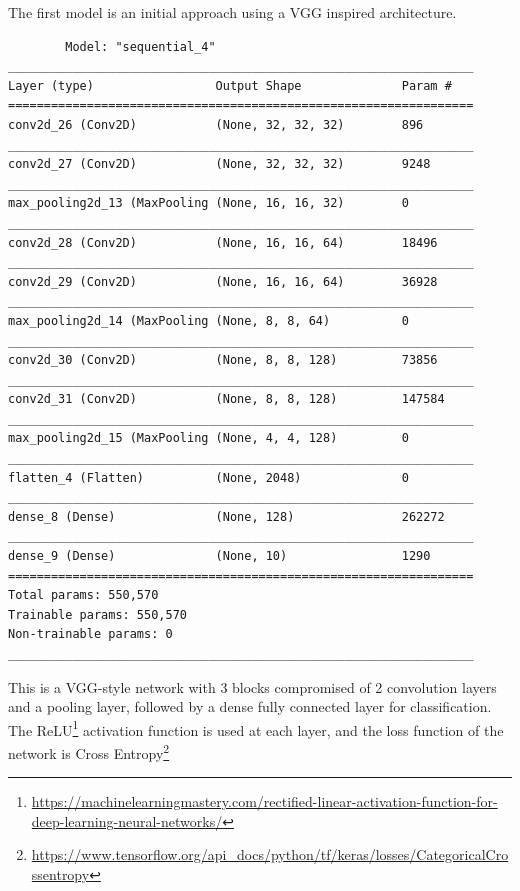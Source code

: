 The first model is an initial approach using a VGG inspired architecture.
\begin{center}
    \begin{verbatim}
        Model: "sequential_4"
_________________________________________________________________
Layer (type)                 Output Shape              Param #   
=================================================================
conv2d_26 (Conv2D)           (None, 32, 32, 32)        896       
_________________________________________________________________
conv2d_27 (Conv2D)           (None, 32, 32, 32)        9248      
_________________________________________________________________
max_pooling2d_13 (MaxPooling (None, 16, 16, 32)        0         
_________________________________________________________________
conv2d_28 (Conv2D)           (None, 16, 16, 64)        18496     
_________________________________________________________________
conv2d_29 (Conv2D)           (None, 16, 16, 64)        36928     
_________________________________________________________________
max_pooling2d_14 (MaxPooling (None, 8, 8, 64)          0         
_________________________________________________________________
conv2d_30 (Conv2D)           (None, 8, 8, 128)         73856     
_________________________________________________________________
conv2d_31 (Conv2D)           (None, 8, 8, 128)         147584    
_________________________________________________________________
max_pooling2d_15 (MaxPooling (None, 4, 4, 128)         0         
_________________________________________________________________
flatten_4 (Flatten)          (None, 2048)              0         
_________________________________________________________________
dense_8 (Dense)              (None, 128)               262272    
_________________________________________________________________
dense_9 (Dense)              (None, 10)                1290      
=================================================================
Total params: 550,570
Trainable params: 550,570
Non-trainable params: 0
_________________________________________________________________
    \end{verbatim}
\end{center}
This is a VGG-style network with 3 blocks compromised of 2 convolution layers and a pooling layer, followed by a dense fully connected layer for classification.
The ReLU\footnote{\href{https://machinelearningmastery.com/rectified-linear-activation-function-for-deep-learning-neural-networks/}{https://machinelearningmastery.com/rectified-linear-activation-function-for-deep-learning-neural-networks/}} activation function is used at each layer, and the loss function of the network is Cross Entropy\footnote{\href{https://www.tensorflow.org/api\_docs/python/tf/keras/losses/CategoricalCrossentropy}{https://www.tensorflow.org/api\_docs/python/tf/keras/losses/CategoricalCrossentropy}}
